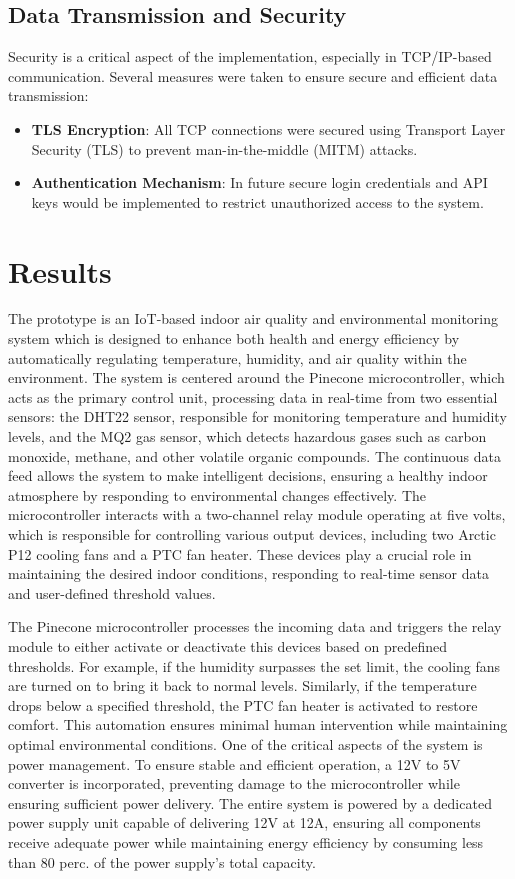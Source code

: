 \documentclass[a4paper]{scrartcl}
\begin{document}
\subsection{Data Transmission and Security}
Security is a critical aspect of the implementation, especially in TCP/IP-based communication. Several measures were taken to ensure secure and efficient data transmission:
\begin{itemize}
    \item \textbf{TLS Encryption}: All TCP connections were secured using Transport Layer Security (TLS) to prevent man-in-the-middle (MITM) attacks.
    \item \textbf{Authentication Mechanism}: In future secure login credentials and API keys would be implemented to restrict unauthorized access to the system.
\end{itemize}

\section{Results}
The prototype is an IoT-based indoor air quality and environmental monitoring system which is designed to enhance both health and energy efficiency by automatically regulating temperature, humidity, and air quality within the environment. The system is centered around the Pinecone microcontroller, which acts as the primary control unit, processing data in real-time from two essential sensors: the DHT22 sensor, responsible for monitoring temperature and humidity levels, and the MQ2 gas sensor, which detects hazardous gases such as carbon monoxide, methane, and other volatile organic compounds. The continuous data feed allows the system to make intelligent decisions, ensuring a healthy indoor atmosphere by responding to environmental changes effectively. The microcontroller interacts with a two-channel relay module operating at five volts, which is responsible for controlling various output devices, including two Arctic P12 cooling fans and a PTC fan heater. These devices play a crucial role in maintaining the desired indoor conditions, responding to real-time sensor data and user-defined threshold values.

The Pinecone microcontroller processes the incoming data and triggers the relay module to either activate or deactivate this devices based on predefined thresholds. For example, if the humidity surpasses the set limit, the cooling fans are turned on to bring it back to normal levels. Similarly, if the temperature drops below a specified threshold, the PTC fan heater is activated to restore comfort. This automation ensures minimal human intervention while maintaining optimal environmental conditions. One of the critical aspects of the system is power management. To ensure stable and efficient operation, a 12V to 5V converter is incorporated, preventing damage to the microcontroller while ensuring sufficient power delivery. The entire system is powered by a dedicated power supply unit capable of delivering 12V at 12A, ensuring all components receive adequate power while maintaining energy efficiency by consuming less than 80 perc. of the power supply’s total capacity.
\end{document}
